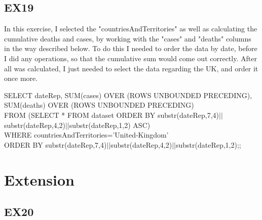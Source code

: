 \documentclass{article}
\begin{document}
\subsection{EX19}
In this exercise, I selected the "countriesAndTerritories" as well as calculating the cumulative deaths and cases, by working with the "cases" and "deaths" columns in the way described below. To do this I needed to order the data by date, before I did any operations, so that the cumulative sum would come out correctly. After all was calculated, I just needed to select the data regarding the UK, and order it once more.
\begin{algorithm} 
SELECT dateRep, SUM(cases) OVER (ROWS UNBOUNDED PRECEDING), SUM(deaths) OVER (ROWS UNBOUNDED PRECEDING) \\
FROM (SELECT * FROM dataset ORDER BY substr(dateRep,7,4)$||$substr(dateRep,4,2)$||$substr(dateRep,1,2) ASC) \\
WHERE countriesAndTerritories='United-Kingdom' \\
ORDER BY substr(dateRep,7,4)$||$substr(dateRep,4,2)$||$substr(dateRep,1,2);;
\end{algorithm} \par

\section{Extension}
\subsection{EX20}
\end{document}
